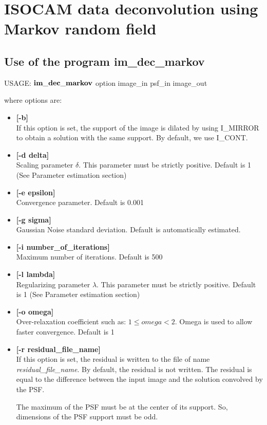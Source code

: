  

\chapter{ISOCAM data deconvolution using Markov random field}

\section{Use of the program im\_dec\_markov}

\begin{center}
 USAGE: ${\bf im\_dec\_markov}$ option image\_in psf\_in image\_out
\end{center}
where options are: 
\begin{itemize}
\item {\bf [-b]} \\
If this option is set, the support of the image is dilated by using I\_MIRROR to
obtain a solution with the same support. By default, we use I\_CONT.
\item {\bf [-d delta]} \\
Scaling parameter $\delta$. This parameter must be strictly positive. 
Default is 1 (See Parameter estimation section)
\item {\bf [-e epsilon]} \\
Convergence parameter. Default is 0.001
\item {\bf [-g sigma]} \\
Gaussian Noise standard deviation. Default is automatically estimated.
\item {\bf [-i number\_of\_iterations]} \\
Maximum number of iterations. Default is 500
\item {\bf [-l lambda]} \\
Regularizing parameter $\lambda$. This parameter must be strictly positive. 
Default is 1 (See Parameter estimation section)
\item {\bf [-o omega]} \\
Over-relaxation coefficient such as: $1\leq omega<2$. Omega is used to allow faster 
convergence. Default is 1 
\item {\bf [-r residual\_file\_name]} \\
If this option is set, the residual is written to 
the file of name {\em residual\_file\_name}. By default, the
residual is not written. The residual is equal to the difference between
the input image and the solution convolved by the PSF.

The maximum of the PSF must be at the center of its support.
So, dimensions of the PSF support must be odd.
\end{itemize}
\noindent

